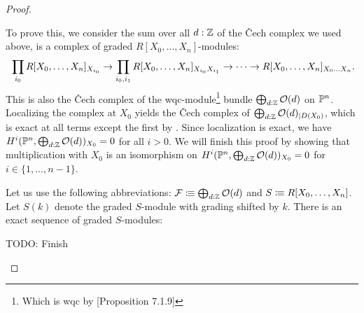 \begin{proof}
\begin{enumerate}[(i)]
    
    To prove this, we consider the sum over all $d:\mathbb{Z}$ of the \v{C}ech complex we used above, is a complex of graded $R[X_0,\dots,X_n]$-modules:
  \[
    \prod_{i_0}R[X_0,\dots,X_n]_{X_{i_0}} \to \prod_{i_0,i_1} R[X_0,\dots,X_n]_{X_{i_0} X_{i_1}} \to \dots \to R[X_0,\dots,X_n]_{X_0\dots X_n}
    \rlap{.}
  \]
  This is also the \v{C}ech complex of the wqc-module\footnote{Which is wqc by \cite{draft}[Proposition 7.1.9]} bundle $\bigoplus_{d:\mathbb{Z}}\mathcal O(d)$ on $\mathbb{P}^n$.
  Localizing the complex at $X_0$ yields the \v{C}ech complex of $\bigoplus_{d:\mathbb{Z}}\mathcal O(d)_{\vert D(X_0)}$, which is exact at all terms except the first by .
  Since localization is exact, we have $H^i(\mathbb{P}^n,\bigoplus_{d:\mathbb{Z}}\mathcal O(d))_{X_0}=0$ for all $i>0$.
  We will finish this proof by showing that multiplication with $X_0$ is an isomorphism on $H^i(\mathbb{P}^n,\bigoplus_{d:\mathbb{Z}}\mathcal O(d))_{X_0}=0$ for $i\in \{1,\dots,n-1\}$.

  Let us use the following abbreviations: $\mathcal F\vcentcolon\mspace{-1.2mu}\equiv \bigoplus_{d:\mathbb{Z}}\mathcal O(d)$ and $S\vcentcolon\mspace{-1.2mu}\equiv R[X_0,\dots,X_n]$.
  Let $S(k)$ denote the graded $S$-module with grading shifted by $k$.
  There is an exact sequence of graded $S$-modules:
  \begin{center}
  \end{center}
  TODO: Finish
  
  \end{enumerate}
\end{proof}
